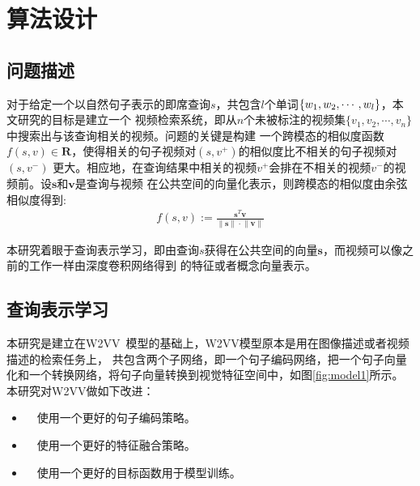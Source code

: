 \chapter{算法设计}

\section{问题描述}
对于给定一个以自然句子表示的即席查询$s$，共包含$l$个单词$\{w_1,w_2,\cdots,\\w_l\}$，本文研究的目标是建立一个
视频检索系统，即从$n$个未被标注的视频集$\{v_1,v_2,\cdots,v_n\}$中搜索出与该查询相关的视频。问题的关键是构建
一个跨模态的相似度函数$f(s,v) \in \mathbf{R}$，使得相关的句子视频对$(s,v^+)$的相似度比不相关的句子视频对$(s,v^-)$
更大。相应地，在查询结果中相关的视频$v^+$会排在不相关的视频$v^-$的视频前。设$\mathbf{s}$和$\mathbf{v}$是查询与视频
在公共空间的向量化表示，则跨模态的相似度由余弦相似度得到:
\begin{equation}
    \label{eq:cosine-sim}
    \begin{aligned}
        f(s,v) := \frac{\mathbf{s}^T\mathbf{v}}{\left\| \mathbf{s} \right\| \cdot \left\| \mathbf{v} \right\|}
    \end{aligned}
\end{equation}

本研究着眼于查询表示学习，即由查询$s$获得在公共空间的向量$\mathbf{s}$，而视频可以像之前的工作一样由深度卷积网络得到
的特征或者概念向量表示。

\section{查询表示学习}
本研究是建立在W2VV~\cite{dong2018predicting}模型的基础上，W2VV模型原本是用在图像描述或者视频描述的检索任务上，
共包含两个子网络，即一个句子编码网络，把一个句子向量化和一个转换网络，将句子向量转换到视觉特征空间中，如图\ref{fig:model1}所示。本研究对W2VV做如下改进：
\begin{itemize}
    \item　使用一个更好的句子编码策略。

    \item　使用一个更好的特征融合策略。

    \item　使用一个更好的目标函数用于模型训练。
\end{itemize}

